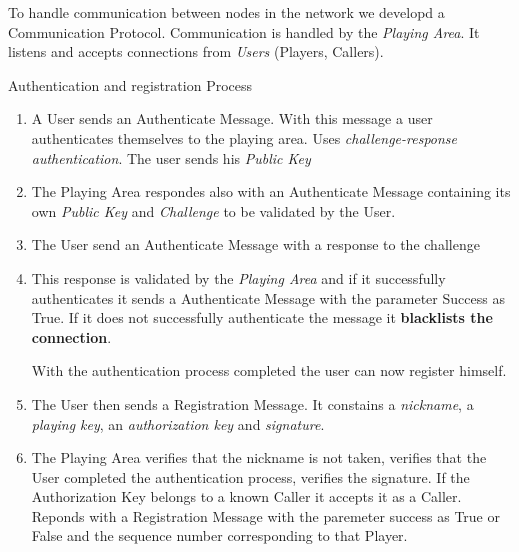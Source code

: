 \documentclass[11pt]{article}
\begin{document}
To handle communication between nodes in the network we developd a Communication Protocol. Communication is handled by the \emph{Playing Area}. It listens and accepts connections from \emph{Users} (Players, Callers).\\
\par {\Large Authentication and registration Process}
\begin{enumerate}


  \item A User sends an Authenticate Message. With this message a user authenticates themselves to the playing area. Uses \emph{challenge-response authentication}. The user sends his \emph{Public Key}
  \item The Playing Area respondes also with an Authenticate Message containing its own \emph{Public Key} and \emph{Challenge} to be validated by the User.
  \item The User send an Authenticate Message with a response to the challenge
  \item This response is validated by the \emph{Playing Area} and if it successfully authenticates it sends a Authenticate Message with the parameter Success as True. If it does not successfully authenticate the message it \textbf{blacklists the connection}. \par With the authentication process completed the user can now register himself.
  \item The User then sends a Registration Message. It constains a \emph{nickname}, a \emph{playing key}, an  \emph{authorization key} and \emph{signature}.
  \item The 	Playing Area verifies that the nickname is not taken, verifies that the User completed the authentication process, verifies the signature. If the Authorization Key belongs to a known Caller it accepts it as a Caller. Reponds with a Registration Message with the paremeter success as True or False and the sequence number corresponding to that Player.

\end{enumerate}
\end{document}
